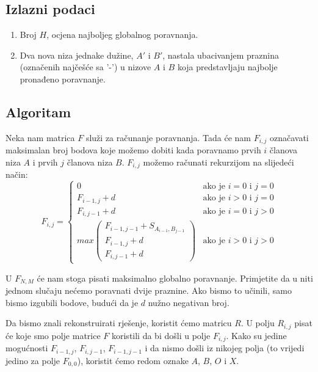 \documentclass[times, utf8, zavrsni]{fer}
\begin{document}
\subsection{Izlazni podaci}
\label{subsec:nwout}
\begin{enumerate}
	\item Broj $H$, ocjena najboljeg globalnog poravnanja.
	\item Dva nova niza jednake dužine, $A'$ i $B'$, nastala ubacivanjem praznina
		(označenih najčešće sa '-') u nizove $A$ i $B$ koja predstavljaju najbolje pronađeno
		poravnanje.
\end{enumerate}

\subsection{Algoritam}
\label{subsec:nwalg}
Neka nam matrica $F$ služi za računanje poravnanja. 
Tada će nam $F_{i,j}$ označavati maksimalan broj bodova koje možemo dobiti kada
poravnamo prvih $i$ članova niza $A$ i prvih $j$ članova niza $B$. $F_{i,j}$ možemo
računati rekurzijom na slijedeći način:
$$
F_{i,j} = \left\{
	\begin{array}{lr}
		0 & \mbox{ako je } i=0 \mbox{ i } j=0 \\
		F_{i-1,j} + d & \mbox{ako je } i>0 \mbox{ i } j=0 \\
		F_{i,j-1} + d & \mbox{ako je } i=0 \mbox{ i } j>0 \\
		max \left(
			\begin{array}{l}
				F_{i-1,j-1} + S_{A_{i-1}, B_{j-1}} \\
				F_{i-1, j} + d \\
				F_{i, j-1} + d
			\end{array}
		\right) & \mbox{ako je } i>0 \mbox{ i } j>0
	\end{array}
\right.
$$

U $F_{N,M}$ će nam stoga pisati maksimalno globalno poravnanje. Primjetite da
u niti jednom slučaju nećemo poravnati dvije praznine. Ako bismo to učinili, 
samo bismo izgubili bodove, budući da je $d$ nužno negativan broj.

Da bismo znali rekonstruirati rješenje, koristit ćemo matricu $R$. U
polju $R_{i,j}$  pisat će koje smo polje matrice $F$ koristili da bi došli u
polje $F_{i,j}$. Kako su jedine mogućnosti $F_{i-1,j}$, $F_{i,j-1}$, $F_{i-1,j-1}$
i da nismo došli iz nikojeg polja (to vrijedi jedino za polje $F_{0,0}$), koristit
ćemo redom oznake $A$, $B$, $O$ i $X$. 
\end{document}
